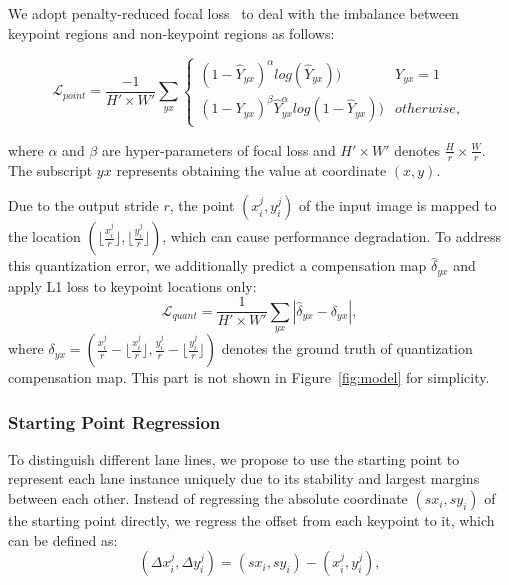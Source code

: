 \documentclass[10pt,twocolumn,letterpaper]{article}
\begin{document}
We adopt penalty-reduced focal loss~\cite{lin2017focal} to deal with the imbalance between keypoint regions and non-keypoint regions as follows:

\begin{scriptsize}
\begin{equation}
\label{equation:point}
\mathcal{L}_{point}=\frac{-1}{H' \times W'} \sum_{yx} 
\left\{
    \begin{array}{lr}
         (1-\hat{Y}_{yx})^\alpha log(\hat{Y}_{yx})) & Y_{yx}=1 \\
         (1-Y_{yx})^\beta \hat{Y}_{yx}^\alpha log(1-\hat{Y}_{yx})) & otherwise,
    \end{array}
\right.
\end{equation}
\end{scriptsize}
where $\alpha$ and $\beta$ are hyper-parameters of focal loss and $H' \times W'$ denotes $\frac{H}{r} \times \frac{W}{r}$. The subscript $yx$ represents obtaining the value at coordinate $(x,y)$. 

Due to the output stride $r$, the point $(x_i^j, y_i^j)$ of the input image is mapped to the location $(\lfloor \frac{x_i^j}{r} \rfloor, \lfloor \frac{y_i^j}{r} \rfloor)$, which can cause performance degradation. 
To address this quantization error, we additionally predict a compensation map $\hat{\delta}_{yx}$ and apply L1 loss to keypoint locations only:
\begin{equation}
\label{equation:quant}
        \mathcal{L}_{quant}= \frac{1}{H' \times W'} \sum_{yx}{\left|\hat{\delta}_{yx} - \delta_{yx} \right|},
\end{equation}
where $ \delta_{yx} = (\frac{x_i^j}{r} - \lfloor \frac{x_i^j}{r} \rfloor, \frac{y_i^j}{r} - \lfloor \frac{y_i^j}{r} \rfloor)$ denotes the ground truth of quantization compensation map.
This part is not shown in Figure~\ref{fig:model} for simplicity.

\subsubsection{Starting Point Regression}
\label{sec:regress}
To distinguish different lane lines, we propose to use the starting point to represent each lane instance uniquely due to its stability and largest margins between each other.
Instead of regressing the absolute coordinate $(sx_i, sy_i)$ of the starting point directly, we regress the offset from each keypoint to it, which can be defined as:
\begin{equation}
\label{equation: displacement}
    (\Delta x_i^j, \Delta y_i^j) = (sx_i, sy_i) - (x_i^j, y_i^j),
\end{equation}
\end{document}
